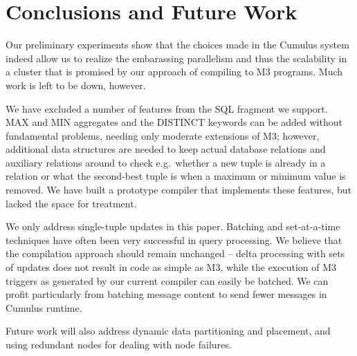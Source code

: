 

\section{Conclusions and Future Work}
\label{sec:conclusions}


Our preliminary experiments show that the choices made in the Cumulus
system indeed allow us to realize the embarassing parallelism and
thus the scalability in a cluster that is promised by our approach of
compiling to M3 programs. Much work is left to be down, however.


We have excluded a number of features from the SQL fragment we support.
MAX and MIN aggregates and the DISTINCT keywords can be added without
fundamental problems, needing only moderate extensions of M3; however,
additional data structures are needed to keep actual database relations
and auxiliary relations
around to check e.g.\ whether a new tuple is already in a relation or what the
second-best tuple is when a maximum or minimum value is removed. We
have built a prototype compiler that implements these features, but lacked the
space for treatment.



We only address single-tuple updates in this paper.
Batching and set-at-a-time techniques have often been
very successful in query processing.
We believe that the compilation approach
should remain unchanged -- delta processing with sets of updates does not
result in code as simple as M3, while the
execution of M3 triggers as generated by our current compiler
can easily be batched. We can profit
particularly from batching message content to send fewer messages in
Cumulus runtime. 



Future work will also address dynamic data partitioning and placement,
and using redundant nodes for
dealing with node failures.



